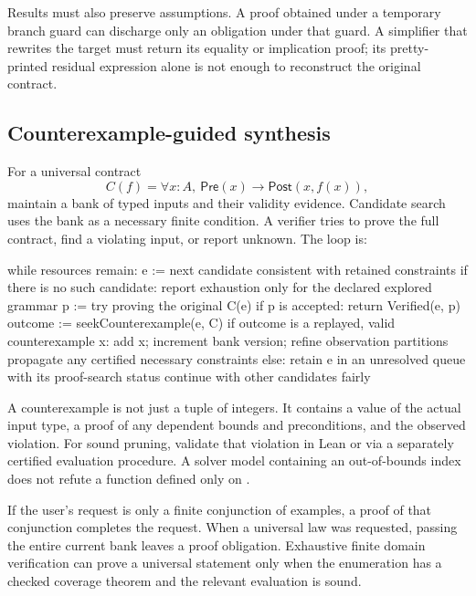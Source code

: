 Results must also preserve assumptions. A proof obtained under a temporary
branch guard can discharge only an obligation under that guard. A simplifier
that rewrites the target must return its equality or implication proof; its
pretty-printed residual expression alone is not enough to reconstruct the
original contract.

\subsection{Counterexample-guided synthesis}

For a universal contract
\[
 C(f)=\forall x:A,\ \mathsf{Pre}(x)\to\mathsf{Post}(x,f(x)),
\]
maintain a bank of typed inputs and their validity evidence. Candidate search
uses the bank as a necessary finite condition. A verifier tries to prove the
full contract, find a violating input, or report unknown. The loop is:
\begin{Code}
while resources remain:
  e := next candidate consistent with retained constraints
  if there is no such candidate:
      report exhaustion only for the declared explored grammar
  p := try proving the original C(e)
  if p is accepted:
      return Verified(e, p)
  outcome := seekCounterexample(e, C)
  if outcome is a replayed, valid counterexample x:
      add x; increment bank version; refine observation partitions
      propagate any certified necessary constraints
  else:
      retain e in an unresolved queue with its proof-search status
      continue with other candidates fairly
\end{Code}

A counterexample is not just a tuple of integers. It contains a value of the
actual input type, a proof of any dependent bounds and preconditions, and the
observed violation. For sound pruning, validate that violation in Lean or via
a separately certified evaluation procedure. A solver model containing an
out-of-bounds index does not refute a function defined only on .

If the user's request is only a finite conjunction of examples, a proof of
that conjunction completes the request. When a universal law was requested,
passing the entire current bank leaves a proof obligation. Exhaustive finite
domain verification can prove a universal statement only when the enumeration
has a checked coverage theorem and the relevant evaluation is sound.

